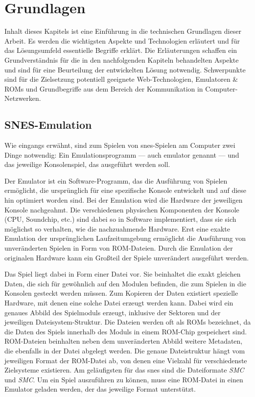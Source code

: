 \chapter{Grundlagen}\label{grundlagen}

Inhalt dieses Kapitels ist eine Einführung in die technischen Grundlagen
dieser Arbeit. Es werden die wichtigsten Aspekte und Technologien
erläutert und für das Lösungsumfeld essentielle Begriffe erklärt. Die
Erläuterungen schaffen ein Grundverständnis für die in den nachfolgenden
Kapiteln behandelten Aspekte und sind für eine Beurteilung der
entwickelten Lösung notwendig. Schwerpunkte sind für die Zielsetzung
potentiell geeignete Web-Technologien, Emulatoren \& ROMs und
Grundbegriffe aus dem Bereich der Kommunikation in Computer-Netzwerken.

\section{SNES-Emulation}\label{snes-emulation}

Wie eingangs erwähnt, sind zum Spielen von \gls{snes}-Spielen am
Computer zwei Dinge notwendig: Ein Emulationsprogramm --- auch
\gls{emulator} genannt --- und das jeweilige Konsolenspiel, das
ausgeführt werden soll.

Der Emulator ist ein Software-Programm, das die Ausführung von Spielen
ermöglicht, die ursprünglich für eine spezifische Konsole entwickelt und
auf diese hin optimiert worden sind. Bei der Emulation wird die Hardware
der jeweiligen Konsole nachgeahmt. Die verschiedenen physischen
Komponenten der Konsole (CPU, Soundchip, etc.) sind dabei so in Software
implementiert, dass sie sich möglichst so verhalten, wie die
nachzuahmende Hardware. Erst eine exakte Emulation der ursprünglichen
Laufzeitumgebung ermöglicht die Ausführung von unveränderten Spielen in
Form von ROM-Dateien. Durch die Emulation der originalen Hardware kann
ein Großteil der Spiele unverändert ausgeführt werden.

Das Spiel liegt dabei in Form einer Datei vor.
Sie beinhaltet die exakt gleichen Daten, die sich für gewöhnlich auf den
Modulen befinden, die zum Spielen in die Konsolen gesteckt werden
müssen. Zum Kopieren der Daten existiert spezielle Hardware, mit denen
eine solche Datei erzeugt werden kann. Dabei wird ein genaues Abbild des
Spielmoduls erzeugt, inklusive der Sektoren und der jeweiligen
Dateisystem-Struktur. Die Dateien werden oft als ROMs bezeichnet, da die
Daten des Spiels innerhalb des Moduls in einem ROM-Chip gespeichert
sind. ROM-Dateien beinhalten neben dem unveränderten Abbild weitere
Metadaten, die ebenfalls in der Datei abgelegt werden. Die genaue
Dateistruktur hängt vom jeweiligen Format der ROM-Datei ab, von denen
eine Vielzahl für verschiedenste Zielsysteme existieren. Am geläufigsten
für das \gls{snes} sind die Dateiformate \emph{SMC} und \emph{SMC}. Um
ein Spiel auszuführen zu können, muss eine ROM-Datei in einen Emulator
geladen werden, der das jeweilige Format unterstützt.

